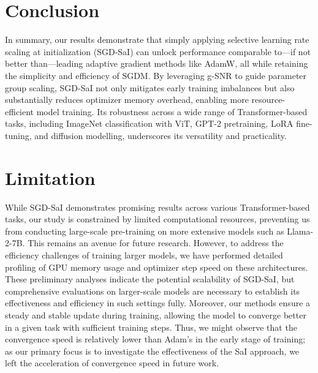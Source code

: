 \section{Conclusion}
In summary, our results demonstrate that simply applying selective learning rate scaling at initialization (SGD-SaI) can unlock performance comparable to—if not better than—leading adaptive gradient methods like AdamW, all while retaining the simplicity and efficiency of SGDM. By leveraging g-SNR to guide parameter group scaling, SGD-SaI not only mitigates early training imbalances but also substantially reduces optimizer memory overhead, enabling more resource-efficient model training. Its robustness across a wide range of Transformer-based tasks, including ImageNet classification with ViT, GPT-2 pretraining, LoRA fine-tuning, and diffusion modelling, underscores its versatility and practicality. 



\section{Limitation}
While SGD-SaI demonstrates promising results across various Transformer-based tasks, our study is constrained by limited computational resources, preventing us from conducting large-scale pre-training on more extensive models such as Llama-2-7B. This remains an avenue for future research. However, to address the efficiency challenges of training larger models, we have performed detailed profiling of GPU memory usage and optimizer step speed on these architectures. These preliminary analyses indicate the potential scalability of SGD-SaI, but comprehensive evaluations on larger-scale models are necessary to establish its effectiveness and efficiency in such settings fully. Moreover, our methods ensure a steady and stable update during training, allowing the model to converge better in a given task with sufficient training steps. Thus, we might observe that the convergence speed is relatively lower than Adam's in the early stage of training; as our primary focus is to investigate the effectiveness of the SaI approach, we left the acceleration of convergence speed in future work.



